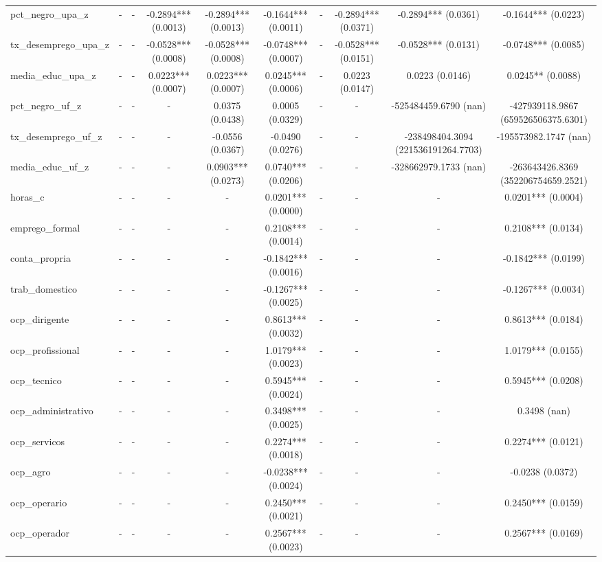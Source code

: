 \begin{table}
\begin{tabular}{lccccccccc}
pct_negro_upa_z & - & - & -0.2894*** (0.0013) & -0.2894*** (0.0013) & -0.1644*** (0.0011) & - & -0.2894*** (0.0371) & -0.2894*** (0.0361) & -0.1644*** (0.0223) \\
tx_desemprego_upa_z & - & - & -0.0528*** (0.0008) & -0.0528*** (0.0008) & -0.0748*** (0.0007) & - & -0.0528*** (0.0151) & -0.0528*** (0.0131) & -0.0748*** (0.0085) \\
media_educ_upa_z & - & - & 0.0223*** (0.0007) & 0.0223*** (0.0007) & 0.0245*** (0.0006) & - & 0.0223 (0.0147) & 0.0223 (0.0146) & 0.0245** (0.0088) \\
pct_negro_uf_z & - & - & - & 0.0375 (0.0438) & 0.0005 (0.0329) & - & - & -525484459.6790 (nan) & -427939118.9867 (659526506375.6301) \\
tx_desemprego_uf_z & - & - & - & -0.0556 (0.0367) & -0.0490 (0.0276) & - & - & -238498404.3094 (221536191264.7703) & -195573982.1747 (nan) \\
media_educ_uf_z & - & - & - & 0.0903*** (0.0273) & 0.0740*** (0.0206) & - & - & -328662979.1733 (nan) & -263643426.8369 (352206754659.2521) \\
horas_c & - & - & - & - & 0.0201*** (0.0000) & - & - & - & 0.0201*** (0.0004) \\
emprego_formal & - & - & - & - & 0.2108*** (0.0014) & - & - & - & 0.2108*** (0.0134) \\
conta_propria & - & - & - & - & -0.1842*** (0.0016) & - & - & - & -0.1842*** (0.0199) \\
trab_domestico & - & - & - & - & -0.1267*** (0.0025) & - & - & - & -0.1267*** (0.0034) \\
ocp_dirigente & - & - & - & - & 0.8613*** (0.0032) & - & - & - & 0.8613*** (0.0184) \\
ocp_profissional & - & - & - & - & 1.0179*** (0.0023) & - & - & - & 1.0179*** (0.0155) \\
ocp_tecnico & - & - & - & - & 0.5945*** (0.0024) & - & - & - & 0.5945*** (0.0208) \\
ocp_administrativo & - & - & - & - & 0.3498*** (0.0025) & - & - & - & 0.3498 (nan) \\
ocp_servicos & - & - & - & - & 0.2274*** (0.0018) & - & - & - & 0.2274*** (0.0121) \\
ocp_agro & - & - & - & - & -0.0238*** (0.0024) & - & - & - & -0.0238 (0.0372) \\
ocp_operario & - & - & - & - & 0.2450*** (0.0021) & - & - & - & 0.2450*** (0.0159) \\
ocp_operador & - & - & - & - & 0.2567*** (0.0023) & - & - & - & 0.2567*** (0.0169) \\

\end{tabular}
\end{table}
